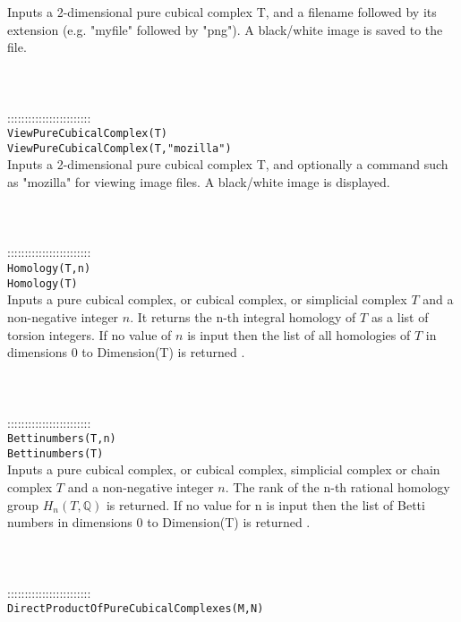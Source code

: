 \documentclass[a4paper,11pt]{report}
\begin{document}
{ Inputs a 2-dimensional pure cubical complex T, and a filename followed by its
extension (e.g. "myfile" followed by "png"). A black/white image is saved to
the file. \\
 \\
 \\
 \\
 ::::::::::::::::::::::::\\
 \texttt{ViewPureCubicalComplex(T)}\\
 \texttt{ViewPureCubicalComplex(T,"mozilla")}\\
 

 Inputs a 2-dimensional pure cubical complex T, and optionally a command such
as "mozilla" for viewing image files. A black/white image is displayed. \\
 \\
 \\
 \\
 ::::::::::::::::::::::::\\
 \texttt{Homology(T,n)}\\
 \texttt{Homology(T)}\\
 

 Inputs a pure cubical complex, or cubical complex, or simplicial complex $T$ and a non-negative integer $n$. It returns the n-th integral homology of $T$ as a list of torsion integers. If no value of $n$ is input then the list of all homologies of $T$ in dimensions 0 to Dimension(T) is returned . \\
 \\
 \\
 \\
 ::::::::::::::::::::::::\\
 \texttt{Bettinumbers(T,n)}\\
 \texttt{Bettinumbers(T)}\\
 

 Inputs a pure cubical complex, or cubical complex, simplicial complex or chain
complex $T$ and a non-negative integer $n$. The rank of the n-th rational homology group $H_n(T,\mathbb Q)$ is returned. If no value for n is input then the list of Betti numbers in
dimensions 0 to Dimension(T) is returned . \\
 \\
 \\
 \\
 ::::::::::::::::::::::::\\
 \texttt{DirectProductOfPureCubicalComplexes(M,N)}\\
 

}
\end{document}
